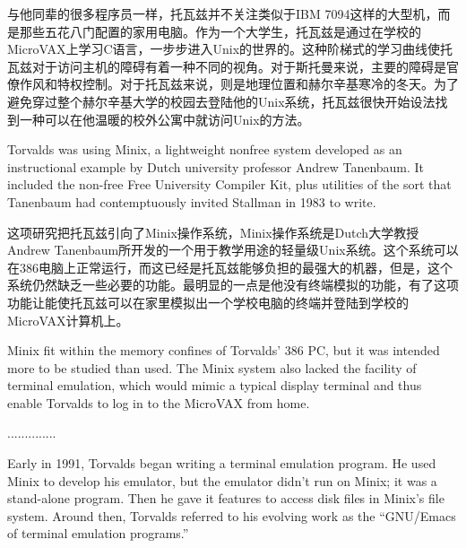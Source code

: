 \ifdefined\chs
与他同辈的很多程序员一样，托瓦兹并不关注类似于IBM 7094这样的大型机，而是那些五花八门配置的家用电脑。作为一个大学生，托瓦兹是通过在学校的MicroVAX上学习C语言，一步步进入Unix的世界的。这种阶梯式的学习曲线使托瓦兹对于访问主机的障碍有着一种不同的视角。对于斯托曼来说，主要的障碍是官僚作风和特权控制。对于托瓦兹来说，则是地理位置和赫尔辛基寒冷的冬天。为了避免穿过整个赫尔辛基大学的校园去登陆他的Unix系统，托瓦兹很快开始设法找到一种可以在他温暖的校外公寓中就访问Unix的方法。
\fi

\ifdefined\eng
Torvalds was using Minix, a lightweight nonfree system developed as an instructional example by Dutch university professor Andrew Tanenbaum. It included the non-free Free University Compiler Kit, plus utilities of the sort that Tanenbaum had contemptuously invited Stallman in 1983 to write.
\fi

\ifdefined\chs
这项研究把托瓦兹引向了Minix操作系统，Minix操作系统是Dutch大学教授Andrew Tanenbaum所开发的一个用于教学用途的轻量级Unix系统。这个系统可以在386电脑上正常运行，而这已经是托瓦兹能够负担的最强大的机器，但是，这个系统仍然缺乏一些必要的功能。最明显的一点是他没有终端模拟的功能，有了这项功能让能使托瓦兹可以在家里模拟出一个学校电脑的终端并登陆到学校的MicroVAX计算机上。
\fi

\ifdefined\eng
Minix fit within the memory confines of Torvalds' 386 PC, but it was intended more to be studied than used.  The Minix system also lacked the facility of terminal emulation, which would mimic a typical display terminal and thus enable Torvalds to log in to the MicroVAX from home.
\fi

\ifdefined\chs
..............
\fi

\ifdefined\eng
Early in 1991, Torvalds began writing a terminal emulation program.  He used Minix to develop his emulator, but the emulator didn't run on Minix; it was a stand-alone program.  Then he gave it features to access disk files in Minix's file system.  Around then, Torvalds referred to his evolving work as the ``GNU/Emacs of terminal emulation programs.''
\fi

